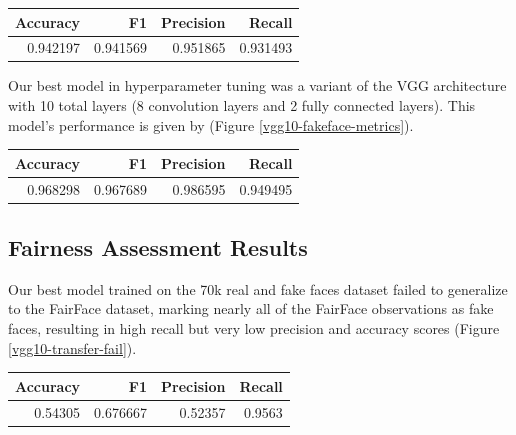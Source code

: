 \documentclass[11pt, letterpaper]{article}
\newenvironment{Figure}
  {\par\medskip\noindent\minipage{\linewidth}}
  {\endminipage\par\medskip}
\begin{document}
\begin{multicols}{2}
  \begin{Figure}
    \label{baseline-metrics}
    \begin{tabular}{rrrr}
    \toprule
     Accuracy &        F1 &  Precision &    Recall \\
    \midrule
     0.942197 &  0.941569 &   0.951865 &  0.931493 \\
    \bottomrule
    \end{tabular}
  \end{Figure}

  Our best model in hyperparameter tuning was a variant of the VGG architecture
  \cite{simonyan2015deep} with 10 total layers (8 convolution layers and 2 fully
  connected layers). This model's performance is given by
  (Figure \ref{vgg10-fakeface-metrics}).
  
  \begin{Figure}
    \centering
    \label{vgg10-fakeface-metrics}
    \begin{tabular}{rrrr}
    \toprule
     Accuracy &        F1 &  Precision &    Recall \\
    \midrule
     0.968298 &  0.967689 &   0.986595 &  0.949495 \\
    \bottomrule
    \end{tabular}
  \end{Figure}
    

  \subsection{Fairness Assessment Results}

  Our best model trained on the 70k real and fake faces dataset failed to
  generalize to the FairFace dataset, marking nearly all of the FairFace
  observations as fake faces, resulting in high recall but very low precision
  and accuracy scores (Figure \ref{vgg10-transfer-fail}).

  \begin{Figure}
    \centering
    \label{vgg10-transfer-fail}
    \begin{tabular}{rrrr}
    \toprule
    Accuracy &        F1 &  Precision &  Recall \\
    \midrule
      0.54305 &  0.676667 &    0.52357 &  0.9563 \\
    \bottomrule
    \end{tabular}
  \end{Figure}


\end{multicols}
\end{document}
